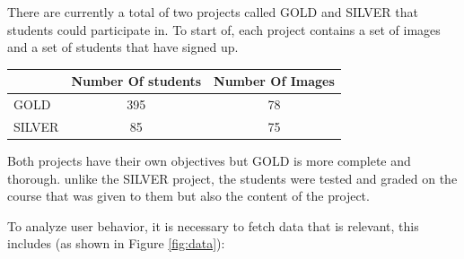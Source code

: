 \documentclass[a4paper,11pt]{report}
\numberwithin{figure}{section} %
\begin{document}
          There are currently a total of two projects called GOLD and SILVER that students could participate in.
          To start of, each project contains a set of images and a set of students that have signed up.
          
          \begin{center}
          \begin{tabular}{| l | c | c |}
          \hline
           & Number Of students & Number Of Images \\ \hline
           GOLD & 395 & 78 \\ \hline
           SILVER & 85 & 75 \\
          \hline
          \end{tabular}
          \end{center}

		  Both projects have their own objectives but GOLD is more complete and thorough.
		  unlike the SILVER project, the students were tested and graded on the course that was given to them but also the content of the project.
         
          To analyze user behavior, it is necessary to fetch data that is relevant, this includes (as shown in Figure \ref{fig:data}):
          
\end{document}
